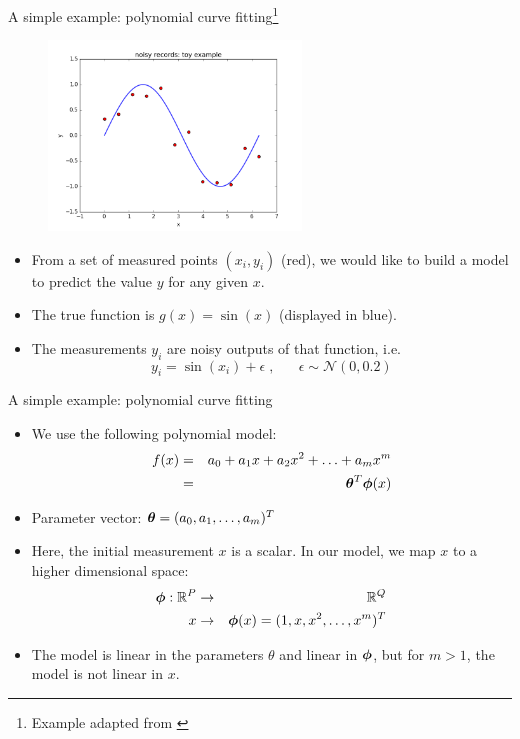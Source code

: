\documentclass[xcolor=pdftex,dvipsnames,table,mathserif]{beamer}
\begin{document}
\begin{frame}{A simple example: polynomial curve fitting\footnote{Example adapted from \cite{Bishop2006}}}
\begin{figure}[htb]
\includegraphics[width=0.6\textwidth]{../graphics/sample_from_sin.png}
\end{figure}
\begin{itemize}
	\item From a set of measured points $(x_i, y_i)$ (red), we would like to build a model to predict the value $y$ for any given $x$.
	\item The true function is $g(x)=\sin (x)$ (displayed in blue).
	\item The measurements $y_i$ are noisy outputs of that function, i.e.
	\begin{equation}
	y_i = \sin (x_i) + \epsilon \; , \;\;\; \;\;\; \epsilon \sim \mathcal{N}(0,0.2)
	\end{equation}
\end{itemize}
\end{frame}

\begin{frame}{A simple example: polynomial curve fitting}
\begin{itemize}
	\item We use the following polynomial model:
	\begin{eqnarray}
	f(x) &=& a_0 + a_1 x + a_2 x^2 + \ldots + a_m x^m \nonumber \\
	&=& \boldsymbol{\theta}^T \boldsymbol{\phi} (x)
	\end{eqnarray}
	\item Parameter vector: $\boldsymbol{\theta} = (a_0, a_1, \ldots, a_m)^T$
	\item Here, the initial measurement $x$ is a scalar. In our model, we map $x$ to a higher dimensional space:
	\begin{eqnarray}
		\boldsymbol{\phi} : \mathbb{R}^{P} &\rightarrow & \mathbb{R}^Q \nonumber \\
		x &\rightarrow & \boldsymbol{\phi} (x) = (1, x, x^2, \ldots, x^m)^T
	\end{eqnarray}
	\item The model is linear in the parameters $\theta$ and linear in $\boldsymbol{\phi}$, but for $m>1$, the model is not linear in $x$.
\end{itemize}
\end{frame}
\end{document}
